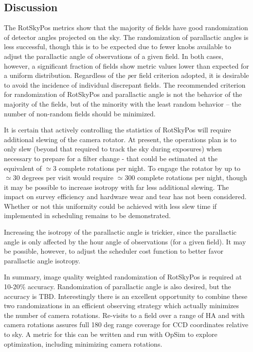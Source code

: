 \subsection{Discussion}

The RotSkyPos metrics show that the majority of fields have good randomization
of detector angles projected on the sky.  The randomization of parallactic
angles is less successful, though this is to be expected due to fewer knobs
available to adjust the parallactic angle of observations of a given field.  In
both cases, however, a significant fraction of fields show metric values lower
than expected for a uniform distribution.  Regardless of the {\emph per field}
criterion adopted, it is desirable to avoid the incidence of individual
discrepant fields.  The recommended criterion for randomization of RotSkyPos and
parallactic angle is not the behavior of the majority of the fields, but of the
minority with the least random behavior -- the number of non-random fields
should be minimized.

It is certain that actively controlling the statistics of RotSkyPos will require
additional slewing of the camera rotator.  At present, the operations plan is to
only slew (beyond that required to track the sky during exposures) when
necessary to prepare for a filter change - that could be estimated at the
equivalent of $\simeq 3$ complete rotations per night.  To engage the rotator by
up to $\simeq 30$ degrees per visit would require $\simeq 300$ complete
rotations per night, though it may be possible to increase isotropy with far
less additional slewing.  The impact on survey efficiency and hardware wear and
tear has not been considered.  Whether or not this uniformity could be achieved
with less slew time if implemented in scheduling remains to be demonstrated.

Increasing the isotropy of the parallactic angle is trickier, since the
parallactic angle is only affected by the hour angle of observations (for a
given field).  It may be possible, however, to adjust the scheduler cost
function to better favor parallactic angle isotropy.

In summary, image quality weighted randomization of RotSkyPos is required at
10-20\% accuracy.   Randomization of parallactic angle is also desired, but the
accuracy is TBD.  Interestingly there is an excellent  opportunity to combine
these two randomizations in an efficient observing strategy which actually
minimizes the number of camera rotations.   Re-visits to a field over a range of
HA and with camera rotations assures full 180 deg range coverage for CCD
coordinates relative to sky.  A metric for this can be written and run with
OpSim to explore optimization, including minimizing camera rotations. 


